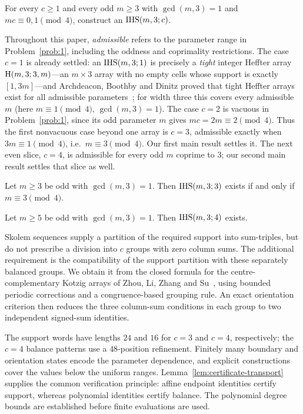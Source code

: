 \begin{problem}\label{prob:1}
For every $c\ge1$ and every odd $m\ge3$ with $\gcd(m,3)=1$ and $mc\equiv0,1\pmod4$, construct an
$\mathrm{IHS}(m,3;c)$.
\end{problem}

Throughout this paper, \emph{admissible} refers to the parameter range in
Problem~\ref{prob:1}, including the oddness and coprimality restrictions.
The case $c=1$ is already
settled: an $\mathrm{IHS}(m,3;1)$ is precisely a
\emph{tight} integer Heffter array $\mathrm{H}(m,3;3,m)$---an $m\times3$ array with no empty cells whose
support is exactly $[1,3m]$---and Archdeacon, Boothby and Dinitz proved that tight Heffter arrays
exist for all admissible parameters~\cite{ABD2017}; for width three this covers every admissible $m$
(here $m\equiv1\pmod4$, $\gcd(m,3)=1$). The case $c=2$ is vacuous in Problem~\ref{prob:1}, since its
odd parameter $m$ gives $mc=2m\equiv2\pmod4$. Thus the first nonvacuous case beyond one array is
$c=3$, admissible exactly when $3m\equiv1\pmod4$, i.e.\ $m\equiv3\pmod4$. Our first main result
settles it. The next even slice, $c=4$, is admissible for every odd $m$ coprime to $3$; our second
main result settles that slice as well.

\begin{theorem}\label{thm:main}
Let $m\ge3$ be odd with $\gcd(m,3)=1$. Then $\mathrm{IHS}(m,3;3)$ exists if and only if $m\equiv3\pmod4$.
\end{theorem}

\begin{theorem}\label{thm:c4full}
Let $m\ge5$ be odd with $\gcd(m,3)=1$. Then $\mathrm{IHS}(m,3;4)$ exists.
\end{theorem}

Skolem sequences supply a partition of the required support into sum-triples, but do not
prescribe a division into $c$ groups with zero column sums. The additional requirement is
the compatibility of the support partition with these separately balanced groups. We obtain
it from the closed formula for the centre-complementary Kotzig arrays of Zhou, Li, Zhang
and Su~\cite{Zhou2018DM}, using bounded periodic corrections and a congruence-based grouping
rule. An exact orientation criterion then reduces the three column-sum conditions in each
group to two independent signed-sum identities.

The support words have lengths $24$ and $16$ for $c=3$ and $c=4$, respectively; the $c=4$
balance patterns use a $48$-position refinement. Finitely many boundary and orientation
states encode the parameter dependence, and explicit constructions cover the values below
the uniform ranges. Lemma~\ref{lem:certificate-transport} supplies the common verification
principle: affine endpoint identities certify support, whereas polynomial identities certify
balance. The polynomial degree bounds are established before finite evaluations are used.

